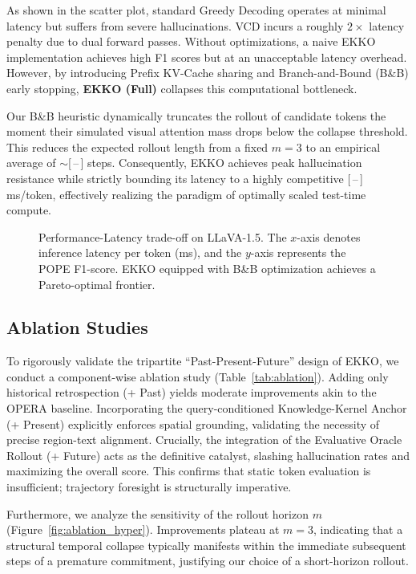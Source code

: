 As shown in the scatter plot, standard Greedy Decoding operates at minimal latency but suffers from severe hallucinations. VCD incurs a roughly $2\times$ latency penalty due to dual forward passes. Without optimizations, a naive EKKO implementation achieves high F1 scores but at an unacceptable latency overhead. However, by introducing Prefix KV-Cache sharing and Branch-and-Bound (B\&B) early stopping, \textbf{EKKO (Full)} collapses this computational bottleneck.

Our B\&B heuristic dynamically truncates the rollout of candidate tokens the moment their simulated visual attention mass drops below the collapse threshold. This reduces the expected rollout length from a fixed $m=3$ to an empirical average of $\sim$[\,--\,] steps. Consequently, EKKO achieves peak hallucination resistance while strictly bounding its latency to a highly competitive [\,--\,] ms/token, effectively realizing the paradigm of optimally scaled test-time compute.

\begin{figure}[t]
    \centering
    \vspace{4cm}
    \caption{Performance-Latency trade-off on LLaVA-1.5. The $x$-axis denotes inference latency per token (ms), and the $y$-axis represents the POPE F1-score. EKKO equipped with B\&B optimization achieves a Pareto-optimal frontier.}
    \label{fig:latency}
\end{figure}

\subsection{Ablation Studies}

To rigorously validate the tripartite ``Past-Present-Future'' design of EKKO, we conduct a component-wise ablation study (Table~\ref{tab:ablation}).
Adding only historical retrospection (+ Past) yields moderate improvements akin to the OPERA baseline. Incorporating the query-conditioned Knowledge-Kernel Anchor (+ Present) explicitly enforces spatial grounding, validating the necessity of precise region-text alignment. Crucially, the integration of the Evaluative Oracle Rollout (+ Future) acts as the definitive catalyst, slashing hallucination rates and maximizing the overall score. This confirms that static token evaluation is insufficient; trajectory foresight is structurally imperative.

Furthermore, we analyze the sensitivity of the rollout horizon $m$ (Figure~\ref{fig:ablation_hyper}). Improvements plateau at $m=3$, indicating that a structural temporal collapse typically manifests within the immediate subsequent steps of a premature commitment, justifying our choice of a short-horizon rollout.

